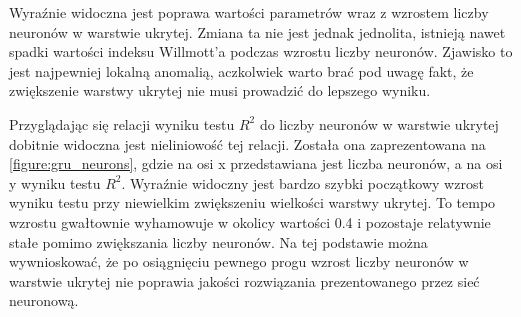 \documentclass[10pt,a4paper]{article}
\begin{document}
Wyraźnie widoczna jest poprawa wartości parametrów wraz z wzrostem liczby neuronów w warstwie ukrytej. Zmiana ta nie jest jednak jednolita, istnieją nawet spadki wartości indeksu Willmott'a podczas wzrostu liczby neuronów. Zjawisko to jest najpewniej lokalną anomalią, aczkolwiek warto brać pod uwagę fakt, że zwiększenie warstwy ukrytej nie musi prowadzić do lepszego wyniku. 

Przyglądając się relacji wyniku testu $R^2$ do liczby neuronów w warstwie ukrytej dobitnie widoczna jest nieliniowość tej relacji. Została ona zaprezentowana na \autoref{figure:gru_neurons}, gdzie na osi x przedstawiana jest liczba neuronów, a na osi y wyniku testu $R^2$. Wyraźnie widoczny jest bardzo szybki początkowy wzrost wyniku testu przy niewielkim zwiększeniu wielkości warstwy ukrytej. To tempo wzrostu gwałtownie wyhamowuje w okolicy wartości 0.4 i pozostaje relatywnie stałe pomimo zwiększania liczby neuronów. Na tej podstawie można wywnioskować, że po osiągnięciu pewnego progu wzrost liczby neuronów w warstwie ukrytej nie poprawia jakości rozwiązania prezentowanego przez sieć neuronową. 
\end{document}
